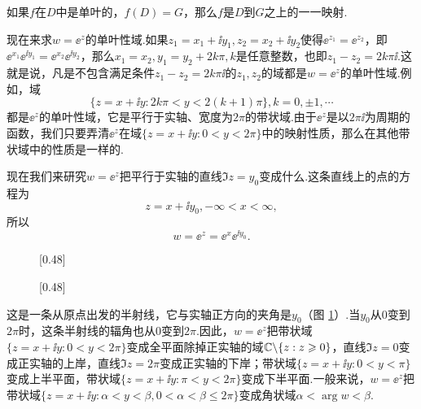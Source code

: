 如果$f$在$D$中是单叶的，$f(D)=G$，那么$f$是$D$到$G$之上的一一映射.

现在来求$w=\ee^z$的单叶性域.如果$z_1=x_1+\ii y_1,z_2=x_2+\ii y_2$使得$\ee^{z_1}=\ee^{z_2} $，即$\ee^{x_1}\ee^{\ii y_1}=\ee^{x_2}\ee^{\ii y_2}$，那么$x_1=x_2,y_1=y_2+2k\pi,k$是任意整数，也即$z_1-z_2=2k\pi\ii$.这就是说，凡是不包含满足条件$z_1-z_2=2k\pi\ii$的$z_1,z_2$的域都是$w=\ee^z$的单叶性域.例如，域
\[
  \{z = x + \ii y:2k\pi < y < 2(k+1)\pi\}, k = 0,\pm1,\cdots
\]
都是$\ee^z$的单叶性域，它是平行于实轴、宽度为$2\pi$的带状域.由于$\ee^z$是以$2\pi\ii$为周期的函数，我们只要弄清$\ee^z$在域$\{z=x+\ii y:0<y<2\pi\}$中的映射性质，那么在其他带状域中的性质是一样的.

现在我们来研究$w=\ee^z$把平行于实轴的直线$\Im z=y_0$变成什么.这条直线上的点的方程为
\[
  z = x + \ii y_0,-\infty < x < \infty,
\]
所以
\[
  w = \ee^z = \ee^x\ee^{\ii y_0}.
\]
\begin{figure}[!ht]
  \centering
  \subcaptionbox{\label{fig2.4a}}[0.48\textwidth]
    {
    }
  \subcaptionbox{\label{fig2.4b}}[0.48\textwidth]
    {
    }
  \caption{\label{fig2.4}}
\end{figure}
这是一条从原点出发的半射线，它与实轴正方向的夹角是$y_0$（图 \ref{fig2.4}）.当$y_0$从$0$变到$2\pi$时，这条半射线的辐角也从$0$变到$2\pi$.因此，$w=\ee^z$把带状域$\{z=x+\ii y:0<y<2\pi\}$变成全平面除掉正实轴的域$\mathbb C\backslash\{z:z\geqslant0\}$，直线$\Im z=0$变成正实轴的上岸，直线$\Im z=2\pi$变成正实轴的下岸；带状域$\{z=x+\ii y:0<y<\pi\}$变成上半平面，带状域$\{z=x+\ii y:\pi<y<2\pi\}$变成下半平面.一般来说，$w=\ee^z$把带状域$\{z=x+\ii y:\alpha<y<\beta,0<\alpha<\beta\le2\pi\}$变成角状域$\alpha<\arg w<\beta$.

